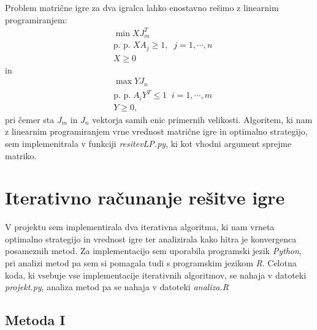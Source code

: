 \documentclass[a4paper,12pt]{article}
\begin{document}
Problem matrične igre za dva igralca lahko enostavno rešimo z linearnim programiranjem:
\begin{equation*}
    \begin{split}
    &\min X J_m^T \\
    & \textrm{p. p.} \; XA_j \geq 1, \; \; j = 1, \cdots, n \\
    & X \geq 0
    \end{split}
\end{equation*}
in 
\begin{equation*}
    \begin{split}
    &\max YJ_n \\
    &\textrm{p. p.} \; A_i Y^T \leq 1 \; \; i = 1, \cdots, m\\
    &Y \geq 0,
    \end{split}
\end{equation*}
pri čemer sta $J_m$ in $J_n$ vektorja samih enic primernih velikosti. Algoritem, ki nam z linearnim programiranjem vrne vrednost matrične igre
in optimalno strategijo, sem implemenitrala v funkciji \textit{resitevLP.py}, ki kot vhodni argument sprejme matriko.
\section{Iterativno računanje rešitve igre}
V projektu sem implementirala dva iterativna algoritma, ki nam vrneta optimalno strategijo in vrednost igre ter analizirala kako hitra je konvergenca posameznih metod. 
Za implementacijo sem uporabila programski jezik \textit{Python}, pri analizi metod pa sem si pomagala tudi s programskim jezikom \textit{R}. Celotna koda, ki vsebuje
vse implementacije iterativnih algoritmov, se nahaja v datoteki \textit{projekt.py}, analiza metod pa se nahaja v datoteki \textit{analiza.R} \par

\subsection{Metoda I}
\end{document}
